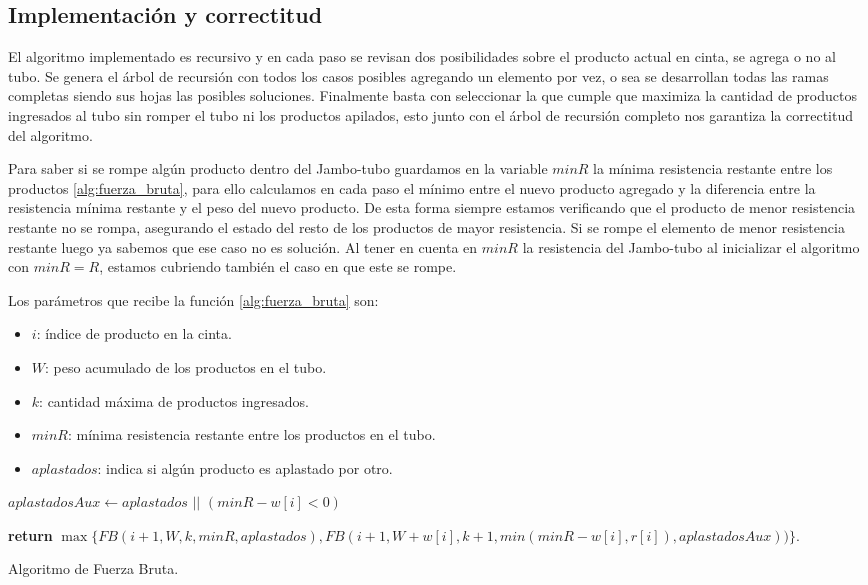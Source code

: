 \documentclass[10pt,a4paper]{article}
\begin{document}
\subsection{Implementación y correctitud}
El algoritmo implementado es recursivo y en cada paso se revisan dos posibilidades sobre el producto actual en cinta, se agrega o no al tubo. Se genera el árbol de recursión con todos los casos posibles agregando un elemento por vez, o sea se desarrollan todas las ramas completas siendo sus hojas las posibles soluciones. Finalmente basta con seleccionar la que cumple que maximiza la cantidad de productos ingresados al tubo sin romper el tubo ni los productos apilados, esto junto con el árbol de recursión completo nos garantiza la correctitud del algoritmo.

Para saber si se rompe algún producto dentro del Jambo-tubo guardamos en la variable $minR$ la mínima resistencia restante entre los productos \ref{alg:fuerza_bruta}, para ello calculamos en cada paso el mínimo entre el nuevo producto agregado y la diferencia entre la resistencia mínima restante y el peso del nuevo producto. De esta forma siempre estamos verificando que el producto de menor resistencia restante no se rompa, asegurando el estado del resto de los productos de mayor resistencia. Si se rompe el elemento de menor resistencia restante luego ya sabemos que ese caso no es solución. Al tener en cuenta en $minR$ la resistencia del Jambo-tubo al inicializar el algoritmo con $minR = R$, estamos cubriendo también el caso en que este se rompe.

Los parámetros que recibe la función \ref{alg:fuerza_bruta} son:
\begin{itemize}
	\item $i$: índice de producto en la cinta.
	\item $W$: peso acumulado de los productos en el tubo.
	\item $k$: cantidad máxima de productos ingresados.
	\item $minR$: mínima resistencia restante entre los productos en el tubo.
	\item $aplastados$: indica si algún producto es aplastado por otro.
\end{itemize}

\begin{algorithm}
	\begin{algorithmic}[1]

		\EndIf
		
		\State $aplastadosAux \leftarrow aplastados$ $||$ $(minR - w[i] < 0)$ 
		
		\State \textbf{return} $\max \{ FB(i+1, W, k, minR, aplastados), FB(i+1, W+w[i], k+1, min(minR - w[i], r[i]), aplastadosAux)) \}$.

		\EndFunction
	\end{algorithmic}
	\caption{Algoritmo de Fuerza Bruta.}
	\label{alg:fuerza_bruta}
\end{algorithm} 	
\end{document}
